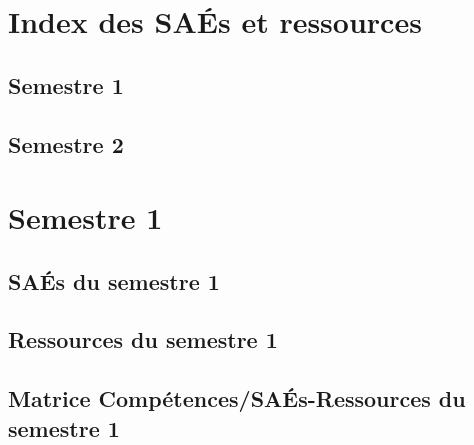 \documentclass[10pt,lualatex,french]{article}
\begin{document}
\clearpage
\section*{Index des SAÉs et ressources}
\subsection*{Semestre 1}
\subsection*{Semestre 2}



\section{Semestre 1}
\def\sem{A}

\subsection{SAÉs du semestre 1}
%
\listeTitreSAE{\sem}
%
\subsection{Ressources du semestre 1}
%
\listeTitreRessourceIndex{\sem}

\subsection{Matrice Compétences/SAÉs-Ressources du semestre 1}
\end{document}
